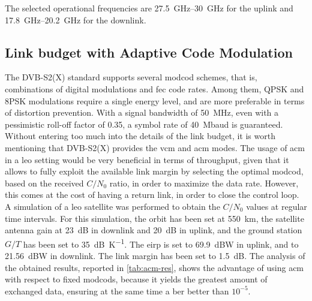 \documentclass[conference,10pt,a4paper]{IEEEtran}%
\begin{document}
The selected operational frequencies are \SIrange{27.5}{30}{\GHz} for the uplink and  \SIrange{17.8}{20.2}{\GHz} for the downlink.

\subsection{Link budget with Adaptive Code Modulation}
The DVB-S2(X) standard supports several \ac{modcod} schemes, that is, combinations of digital modulations and \ac{fec} code rates.
Among them, QPSK and 8PSK modulations require a single energy level, and are more preferable in terms of distortion prevention.
With a signal bandwidth of \SI{50}{\MHz}, even with a pessimistic roll-off factor of \num{0.35}, a symbol rate of \SI{40}{Mbaud} is guaranteed.
Without entering too much into the details of the link budget, it is worth mentioning that DVB-S2(X) provides the \ac{vcm} and \ac{acm} modes.
The usage of \ac{acm} in a \ac{leo} setting would be very beneficial in terms of throughput, given that it allows to fully exploit the available link margin by selecting the optimal \ac{modcod}, based on the received $C/N_0$ ratio, in order to maximize the data rate.
However, this comes at the cost of having a return link, in order to close the control loop.
A simulation of a \ac{leo} satellite was performed to obtain the $C/N_0$ values at regular time intervals.
For this simulation, the orbit has been set at \SI{550}{\km}, the satellite antenna gain at \SI{23}{dB} in downlink and \SI{20}{dB} in uplink, and the ground station $G/T$ has been set to \SI{35}{dB\per\kelvin}.
The \ac{eirp} is set to \SI{69.9}{dBW} in uplink, and to \SI{21.56}{dBW} in downlink.
The link margin has been set to \SI{1.5}{dB}.
The analysis of the obtained results, reported in \cref{tab:acm-res}, shows the advantage of using \ac{acm} with respect to fixed \glspl{modcod}, because it yields the greatest amount of exchanged data, ensuring at the same time a \ac{ber} better than $10^{-5}$.
\end{document}
